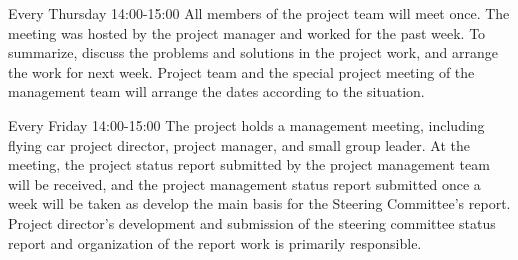 Every Thursday 14:00-15:00 All members of the project team will meet once. The meeting was hosted by the project manager and worked for the past week. To summarize, discuss the problems and solutions in the project work, and arrange the work for next week. Project team and the special project meeting of the management team will arrange the dates according to the situation.

Every Friday 14:00-15:00 The project holds a management meeting, including flying car project director, project manager, and small group leader. At the meeting, the project status report submitted by the project management team will be received, and the project management status report submitted once a week will be taken as develop the main basis for the Steering Committee's report. Project director's development and submission of the steering committee status report and organization of the report work is primarily responsible.



